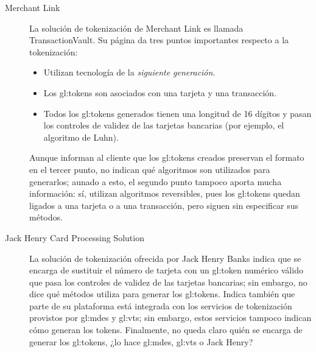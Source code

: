 \begin{description}
  \item[Merchant Link]
    La solución de tokenización de Merchant Link es llamada TransactionVault. Su
    página da tres puntos importantes respecto a la tokenización:
    \begin{itemize}
      \item Utilizan tecnología de la \textit{siguiente generación}.
      \item Los \glspl{gl:token} son asociados con una tarjeta y una
        transacción.
      \item Todos los \glspl{gl:token} generados tienen una longitud de 16
        dígitos y pasan los controles de validez de las tarjetas bancarias
        (por ejemplo, el algoritmo de Luhn).
      \end{itemize}
      Aunque informan al cliente que los \glspl{gl:token} creados preservan el
      formato en el tercer punto, no indican qué algoritmos son utilizados para
      generarlos; aunado a esto, el segundo punto tampoco aporta mucha
      información: sí, utilizan algoritmos reversibles, pues los
      \glspl{gl:token} quedan ligados a una tarjeta o a una transacción,
      pero siguen sin especificar sus métodos.

    \item[Jack Henry Card Processing Solution]
      La solución de tokenización ofrecida por Jack Henry Banks indica que se
      encarga de sustituir el número de tarjeta con un \gls{gl:token} numérico
      válido que pasa los controles de validez  de las tarjetas bancarias; sin
      embargo, no dice qué métodos utiliza para generar los \glspl{gl:token}.
      Indica también que parte de su plataforma está integrada con los servicios
      de tokenización provistos por \gls{gl:mdes} y \gls{gl:vts}; sin embargo,
      estos servicios tampoco indican cómo generan los tokens. Finalmente, no
      queda claro quién se encarga de generar los \glspl{gl:token}, ¿lo hace
      \gls{gl:mdes}, \gls{gl:vts} o Jack Henry?


\end{description}

